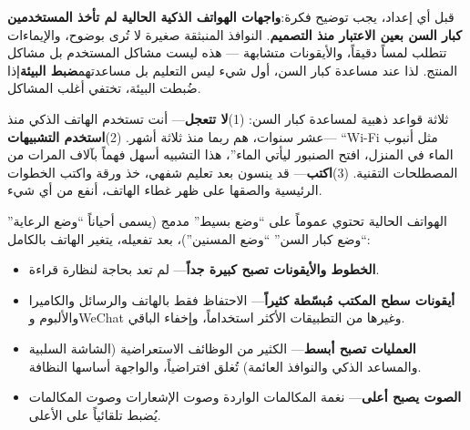 


قبل أي إعداد، يجب توضيح فكرة:\textbf{واجهات الهواتف الذكية الحالية لم تأخذ المستخدمين كبار السن بعين الاعتبار منذ التصميم}. النوافذ المنبثقة صغيرة لا تُرى بوضوح، والإيماءات تتطلب لمساً دقيقاً، والأيقونات متشابهة — هذه ليست مشاكل المستخدم بل مشاكل المنتج. لذا عند مساعدة كبار السن، أول شيء ليس التعليم بل مساعدتهم\textbf{ضبط البيئة}إذا ضُبطت البيئة، تختفي أغلب المشاكل.

ثلاثة قواعد ذهبية لمساعدة كبار السن: (1)\textbf{لا تتعجل}— أنت تستخدم الهاتف الذكي منذ عشر سنوات، هم ربما منذ ثلاثة أشهر. (2)\textbf{استخدم التشبيهات}— “Wi-Fi مثل أنبوب الماء في المنزل، افتح الصنبور ليأتي الماء”، هذا التشبيه أسهل فهماً بآلاف المرات من المصطلحات التقنية. (3)\textbf{اكتب}— قد ينسون بعد تعليم شفهي، خذ ورقة واكتب الخطوات الرئيسية والصقها على ظهر غطاء الهاتف، أنفع من أي شيء.


الهواتف الحالية تحتوي عموماً على “وضع بسيط” مدمج (يسمى أحياناً “وضع الرعاية” “وضع كبار السن” “وضع المسنين”)، بعد تفعيله، يتغير الهاتف بالكامل:

\begin{itemize}
  \item \textbf{الخطوط والأيقونات تصبح كبيرة جداً}— لم تعد بحاجة لنظارة قراءة.
  \item \textbf{أيقونات سطح المكتب مُبسّطة كثيراً}— الاحتفاظ فقط بالهاتف والرسائل والكاميرا والألبوم وWeChat وغيرها من التطبيقات الأكثر استخداماً، وإخفاء الباقي.
  \item \textbf{العمليات تصبح أبسط}— الكثير من الوظائف الاستعراضية (الشاشة السلبية والمساعد الذكي والنوافذ العائمة) تُغلق افتراضياً، والواجهة أساسها النظافة.
  \item \textbf{الصوت يصبح أعلى}— نغمة المكالمات الواردة وصوت الإشعارات وصوت المكالمات يُضبط تلقائياً على الأعلى.
\end{itemize}

